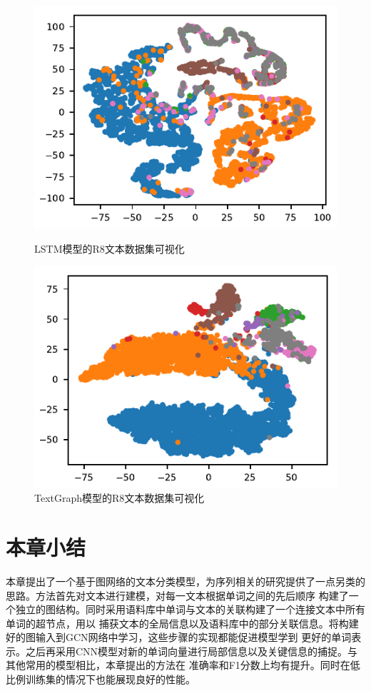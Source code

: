 \begin{figure}[htb]
    \begin{minipage}[t]{0.5\linewidth}
    \centering
    \includegraphics[width=1\textwidth]{pic/R8-RNN.pdf}
    \caption{LSTM模型的R8文本数据集可视化}
    \label{r8_embeding}
    \end{minipage}
    \quad
    \begin{minipage}[t]{0.5\linewidth}
    \centering
    \includegraphics[width=1\textwidth]{pic/R8-TextGraph.pdf}
    \caption{TextGraph模型的R8文本数据集可视化}
    \label{R8_TextGraph}
    \end{minipage}
\end{figure}

\section{本章小结}
本章提出了一个基于图网络的文本分类模型，为序列相关的研究提供了一点另类的思路。方法首先对文本进行建模，对每一文本根据单词之间的先后顺序
构建了一个独立的图结构。同时采用语料库中单词与文本的关联构建了一个连接文本中所有单词的超节点，用以
捕获文本的全局信息以及语料库中的部分关联信息。将构建好的图输入到GCN网络中学习，这些步骤的实现都能促进模型学到
更好的单词表示。之后再采用CNN模型对新的单词向量进行局部信息以及关键信息的捕捉。与其他常用的模型相比，本章提出的方法在
准确率和F1分数上均有提升。同时在低比例训练集的情况下也能展现良好的性能。